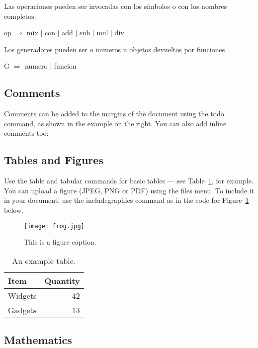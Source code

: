 \documentclass[a4paper]{article}
\begin{document}
Las operaciones pueden ser invocadas con los símbolos o con los nombres completos.
\begin{center}
op $\Rightarrow$ mix $|$ con $|$ add $|$ sub $|$ mul $|$ div \\ 
\end{center}

Los generadores pueden ser o numeros u objetos devueltos por funciones
\begin{center}
G $\Rightarrow$ numero $|$ funcion \\ 
\end{center}





\subsection{Comments}

Comments can be added to the margins of the document using the  todo command, as shown in the example on the right. You can also add inline comments too:


\subsection{Tables and Figures}

Use the table and tabular commands for basic tables --- see Table~\ref{tab:widgets}, for example. You can upload a figure (JPEG, PNG or PDF) using the files menu. To include it in your document, use the includegraphics command as in the code for Figure~\ref{fig:frog} below.

\begin{figure}
\centering
\texttt{[image: frog.jpg]}
\caption{\label{fig:frog}This is a figure caption.}
\end{figure}

\begin{table}
\centering
\begin{tabular}{l|r}
Item & Quantity \\\hline
Widgets & 42 \\
Gadgets & 13
\end{tabular}
\caption{\label{tab:widgets}An example table.}
\end{table}

\subsection{Mathematics}
\end{document}

